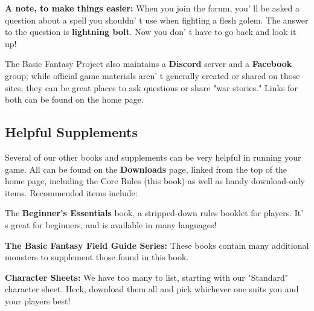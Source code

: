 \documentclass[a4paper,twoside,openany,10pt]{book}
\begin{document}
\textbf{A note, to make things easier:} When you join the forum, you' ll be asked a question about a spell you shouldn' t use when fighting a flesh golem. The answer to the question is \textbf{lightning bolt}. Now you don' t have to go back and look it up!

The Basic Fantasy Project also maintains a \textbf{Discord} server and a \textbf{Facebook} group; while official game materials aren' t generally created or shared on those sites, they can be great places to ask questions or share "war stories." Links for both can be found on the home page.

\subsection{Helpful Supplements}\label{helpful-supplements}

Several of our other books and supplements can be very helpful in running your game. All can be found on the \textbf{Downloads} page, linked from the top of the home page, including the Core Rules (this book) as well as handy download-only items. Recommended items include:

The \textbf{Beginner's Essentials} book, a stripped-down rules booklet for players. It' s great for beginners, and is available in many languages!

\textbf{The Basic Fantasy Field Guide \textbf{Series}:} These books contain many additional monsters to supplement those found in this book. 

\textbf{Character Sheets:} We have too many to list, starting with our "Standard" character sheet. Heck, download them all and pick whichever one suits you and your players best!

\pagebreak
\printindex

\pagebreak
\end{document}
